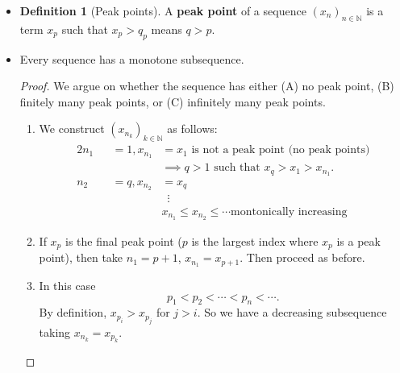 \documentclass{article}
\newcommand{\N}{\mathbb{N}}
\newcommand{\seq}[2]{(#1_{#2})_{#2 \in \N}}
\newcommand{\?}{\stackrel{?}{=}}
\theoremstyle{definition} %
\newtheorem{definition}[subsection]{Definition} %
\begin{document}
\begin{itemize}
    \item[]
          \begin{definition}[Peak points]
              A \textbf{peak point} of a sequence $\seq{x}{n}$ is a term $x_p$ such that $x_p > q_p$ means $q > p$.
          \end{definition}
    \item[]
          \begin{lemma}
              Every sequence has a monotone subsequence.
          \end{lemma}
          \begin{proof}
              We argue on whether the sequence has either (A) no peak point, (B) finitely many peak points, or (C) infinitely many peak points.
              \begin{enumerate}[label=(\Alph*)]
                  \item We construct $(x_{n_k})_{k \in \N}$ as follows:
                        \begin{alignat*}{2}
                            n_1 &  & = 1, x_{n_1} & = x_1 \text{ is not a peak point (no peak points)}              \\
                                &  &              & \implies q>1 \text{ such that } x_q > x_1 > x_{n_1}.            \\
                            n_2 &  & = q, x_{n_2} & = x_q                                                           \\
                                &  &              & \hspace{6pt}\vdots                                              \\
                                &  &              & x_{n_1} \leq x_{n_2} \leq \cdots \text{montonically increasing}
                        \end{alignat*}
                  \item If $x_p$ is the final peak point ($p$ is the largest index where $x_p$ is a peak point), then take $n_1 = p + 1$, $x_{n_1} = x_{p + 1}$. Then proceed as before.
                  \item In this case
                        $$p_1 < p_2 < \cdots < p_n < \cdots.$$
                        By definition, $x_{p_i} > x_{p_j}$ for $j > i$. So we have a decreasing subsequence taking $x_{n_k} = x_{p_k}$.
              \end{enumerate}
          \end{proof}

\end{itemize}
\end{document}
